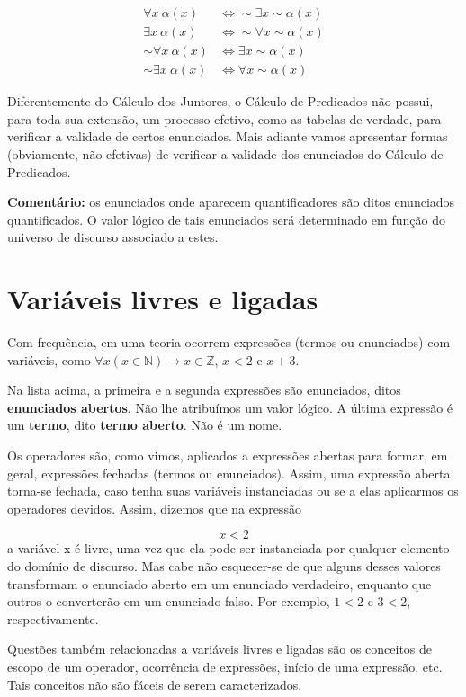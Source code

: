 \begin{align*}
    \forall x\ \alpha (x) & \iff \sim \exists x \sim \alpha (x) \\
    \exists x\ \alpha (x) & \iff \sim \forall x \sim \alpha (x) \\
    \sim \forall x\ \alpha (x) & \iff \exists x \sim \alpha (x) \\
    \sim \exists x\ \alpha (x) & \iff \forall x \sim \alpha (x)
\end{align*}

Diferentemente do Cálculo dos Juntores, o Cálculo de Predicados não possui, para toda sua extensão, um processo efetivo, como as tabelas de verdade, para verificar a validade de certos enunciados.
Mais adiante vamos apresentar formas (obviamente, não efetivas) de verificar a validade dos enunciados do Cálculo de Predicados.

\noindent \textbf{Comentário:} os enunciados onde aparecem quantificadores são ditos enunciados quantificados.
O valor lógico de tais enunciados será determinado em função do universo de discurso associado a estes.

\section{Variáveis livres e ligadas}
Com frequência, em uma teoria ocorrem expressões (termos ou enunciados) com variáveis, como $\forall x (x \in \mathbb{N}) \to x \in \mathbb{Z}$, $x < 2$ e $x + 3$.

Na lista acima, a primeira e a segunda expressões são enunciados, ditos \textbf{enunciados abertos}.
Não lhe atribuímos um valor lógico.
A última expressão é um \textbf{termo}, dito \textbf{termo aberto}.
Não é um nome.

Os operadores são, como vimos, aplicados a expressões abertas para formar, em geral, expressões fechadas (termos ou enunciados).
Assim, uma expressão aberta torna-se fechada, caso tenha suas variáveis instanciadas ou se a elas aplicarmos os operadores devidos.
Assim, dizemos que na expressão

$$x < 2$$
a variável x é livre, uma vez que ela pode ser instanciada por qualquer elemento do domínio de discurso.
Mas cabe não esquecer-se de que alguns desses valores transformam o enunciado aberto em um enunciado verdadeiro, enquanto que outros o converterão em um enunciado falso.
Por exemplo, $1 < 2$ e $3 < 2$, respectivamente.

Questões também relacionadas a variáveis livres e ligadas são os conceitos de escopo de um operador, ocorrência de expressões, início de uma expressão, etc.
Tais conceitos não são fáceis de serem caracterizados.

